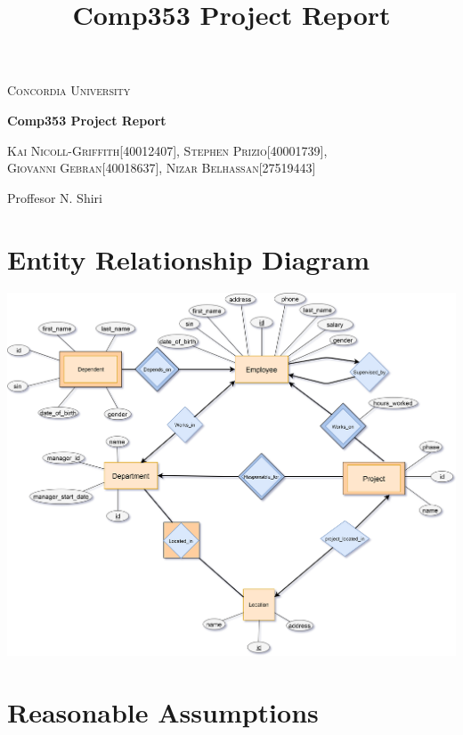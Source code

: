 \documentclass[fleqn, 11pt,letterpaper]{article}
\title{Comp353 Project Report}
\author{}
\begin{document}
	

	\begin{titlepage}
		\centering
		{\scshape\LARGE Concordia University \par}
		\vspace{1cm}
		{\scshape\Large \par}
		\vspace{1.5cm}
		{\huge\bfseries Comp353 Project Report\par}
		\vspace{2cm}
		{\Large\scshape Kai Nicoll-Griffith[40012407], Stephen Prizio[40001739], \\Giovanni Gebran[40018637], Nizar Belhassan[27519443]\par}
		\vspace{2cm}{\Large	Team kzc353\_4\par}
		\vspace{3cm}
		{Proffesor N. Shiri\par}
	\end{titlepage}

\tableofcontents


	\section{Entity Relationship Diagram}
			\newcommand{\graphicwidth}{18.5cm}
\hspace*{-1.1cm}\includegraphics[width=\graphicwidth]{erd.png}

\pagebreak

	\section{Reasonable Assumptions}
\end{document}

